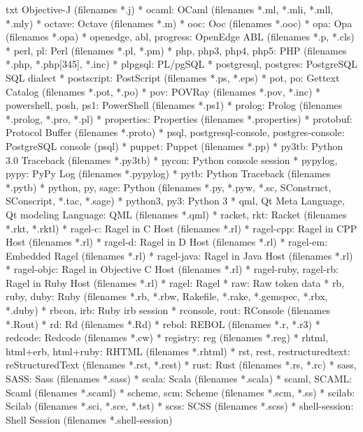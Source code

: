 \documentclass[11pt,oneside]{book}
\begin{document}
\begin{common-format}
\begin{xverbatim}{txt}
    Objective-J (filenames *.j)
* ocaml:
    OCaml (filenames *.ml, *.mli, *.mll, *.mly)
* octave:
    Octave (filenames *.m)
* ooc:
    Ooc (filenames *.ooc)
* opa:
    Opa (filenames *.opa)
* openedge, abl, progress:
    OpenEdge ABL (filenames *.p, *.cls)
* perl, pl:
    Perl (filenames *.pl, *.pm)
* php, php3, php4, php5:
    PHP (filenames *.php, *.php[345], *.inc)
* plpgsql:
    PL/pgSQL 
* postgresql, postgres:
    PostgreSQL SQL dialect 
* postscript:
    PostScript (filenames *.ps, *.eps)
* pot, po:
    Gettext Catalog (filenames *.pot, *.po)
* pov:
    POVRay (filenames *.pov, *.inc)
* powershell, posh, ps1:
    PowerShell (filenames *.ps1)
* prolog:
    Prolog (filenames *.prolog, *.pro, *.pl)
* properties:
    Properties (filenames *.properties)
* protobuf:
    Protocol Buffer (filenames *.proto)
* psql, postgresql-console, postgres-console:
    PostgreSQL console (psql) 
* puppet:
    Puppet (filenames *.pp)
* py3tb:
    Python 3.0 Traceback (filenames *.py3tb)
* pycon:
    Python console session 
* pypylog, pypy:
    PyPy Log (filenames *.pypylog)
* pytb:
    Python Traceback (filenames *.pytb)
* python, py, sage:
    Python (filenames *.py, *.pyw, *.sc, SConstruct, SConscript, *.tac, *.sage)
* python3, py3:
    Python 3 
* qml, Qt Meta Language, Qt modeling Language:
    QML (filenames *.qml)
* racket, rkt:
    Racket (filenames *.rkt, *.rktl)
* ragel-c:
    Ragel in C Host (filenames *.rl)
* ragel-cpp:
    Ragel in CPP Host (filenames *.rl)
* ragel-d:
    Ragel in D Host (filenames *.rl)
* ragel-em:
    Embedded Ragel (filenames *.rl)
* ragel-java:
    Ragel in Java Host (filenames *.rl)
* ragel-objc:
    Ragel in Objective C Host (filenames *.rl)
* ragel-ruby, ragel-rb:
    Ragel in Ruby Host (filenames *.rl)
* ragel:
    Ragel 
* raw:
    Raw token data 
* rb, ruby, duby:
    Ruby (filenames *.rb, *.rbw, Rakefile, *.rake, *.gemspec, *.rbx, *.duby)
* rbcon, irb:
    Ruby irb session 
* rconsole, rout:
    RConsole (filenames *.Rout)
* rd:
    Rd (filenames *.Rd)
* rebol:
    REBOL (filenames *.r, *.r3)
* redcode:
    Redcode (filenames *.cw)
* registry:
    reg (filenames *.reg)
* rhtml, html+erb, html+ruby:
    RHTML (filenames *.rhtml)
* rst, rest, restructuredtext:
    reStructuredText (filenames *.rst, *.rest)
* rust:
    Rust (filenames *.rs, *.rc)
* sass, SASS:
    Sass (filenames *.sass)
* scala:
    Scala (filenames *.scala)
* scaml, SCAML:
    Scaml (filenames *.scaml)
* scheme, scm:
    Scheme (filenames *.scm, *.ss)
* scilab:
    Scilab (filenames *.sci, *.sce, *.tst)
* scss:
    SCSS (filenames *.scss)
* shell-session:
    Shell Session (filenames *.shell-session)

\end{xverbatim}
\end{common-format}
\end{document}
